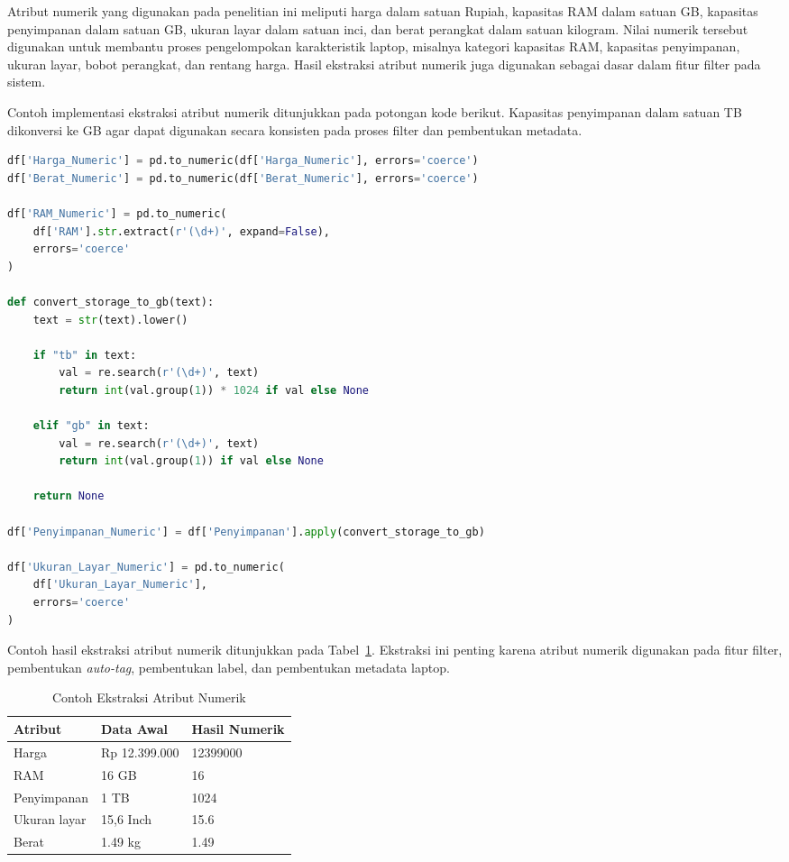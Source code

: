 Atribut numerik yang digunakan pada penelitian ini meliputi harga dalam satuan Rupiah, kapasitas RAM dalam satuan GB, kapasitas penyimpanan dalam satuan GB, ukuran layar dalam satuan inci, dan berat perangkat dalam satuan kilogram. Nilai numerik tersebut digunakan untuk membantu proses pengelompokan karakteristik laptop, misalnya kategori kapasitas RAM, kapasitas penyimpanan, ukuran layar, bobot perangkat, dan rentang harga. Hasil ekstraksi atribut numerik juga digunakan sebagai dasar dalam fitur filter pada sistem.

Contoh implementasi ekstraksi atribut numerik ditunjukkan pada potongan kode berikut. Kapasitas penyimpanan dalam satuan TB dikonversi ke GB agar dapat digunakan secara konsisten pada proses filter dan pembentukan metadata.

\begin{lstlisting}[basicstyle=\linespread{0.8}\ttfamily\footnotesize, language=Python, breaklines=true, caption={Potongan Kode Ekstraksi Atribut Numerik}, label=kode:ekstraksi_atribut_numerik]
df['Harga_Numeric'] = pd.to_numeric(df['Harga_Numeric'], errors='coerce')
df['Berat_Numeric'] = pd.to_numeric(df['Berat_Numeric'], errors='coerce')

df['RAM_Numeric'] = pd.to_numeric(
    df['RAM'].str.extract(r'(\d+)', expand=False),
    errors='coerce'
)

def convert_storage_to_gb(text):
    text = str(text).lower()

    if "tb" in text:
        val = re.search(r'(\d+)', text)
        return int(val.group(1)) * 1024 if val else None

    elif "gb" in text:
        val = re.search(r'(\d+)', text)
        return int(val.group(1)) if val else None

    return None

df['Penyimpanan_Numeric'] = df['Penyimpanan'].apply(convert_storage_to_gb)

df['Ukuran_Layar_Numeric'] = pd.to_numeric(
    df['Ukuran_Layar_Numeric'],
    errors='coerce'
)
\end{lstlisting}

Contoh hasil ekstraksi atribut numerik ditunjukkan pada Tabel~\ref{tab:contoh_ekstraksi_numerik_bab3}. Ekstraksi ini penting karena atribut numerik digunakan pada fitur filter, pembentukan \textit{auto-tag}, pembentukan label, dan pembentukan metadata laptop.

\begin{table}[htbp]
\centering
\caption{Contoh Ekstraksi Atribut Numerik}
\label{tab:contoh_ekstraksi_numerik_bab3}
\begin{tabular}{|l|l|l|}
\hline
\textbf{Atribut} & \textbf{Data Awal} & \textbf{Hasil Numerik} \\ \hline
Harga & Rp 12.399.000 & 12399000 \\ \hline
RAM & 16 GB & 16 \\ \hline
Penyimpanan & 1 TB & 1024 \\ \hline
Ukuran layar & 15,6 Inch & 15.6 \\ \hline
Berat & 1.49 kg & 1.49 \\ \hline
\end{tabular}
\end{table}

